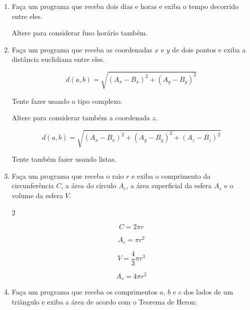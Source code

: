 \begin{enumerate}

	\item Faça um programa que receba dois dias e horas e exiba o tempo decorrido entre eles.
	
	Altere para considerar fuso horário também. 

	\item Faça um programa que receba as coordenadas $x$ e $y$ de dois pontos e exiba a distância euclidiana entre eles.
	
	\begin{equation*}
		d(a,b) = \sqrt{(A_x - B_x)^2 + (A_y - B_y)^2}
	\end{equation*}
	
	Tente fazer usando o tipo complexo.
	
	Altere para considerar também a coordenada $z$.
	
	\begin{equation*}
		d(a,b) = \sqrt{(A_x - B_x)^2 + (A_y - B_y)^2 + (A_z - B_z)^2}
	\end{equation*}
	
	Tente também fazer usando listas.
	
	\item Faça um programa que receba o raio $r$ e exiba o comprimento da circunferência $C$, a área do círculo $A_c$, a área superficial da esfera $A_s$ e o volume da esfera $V$.
	
	\begin{multicols}{2}
			
		\begin{equation*}
			C = 2 \pi r
		\end{equation*}
		
		\begin{equation*}
			A_c = \pi r^2
		\end{equation*}		
		
		\begin{equation*}
			V = \frac{4}{3} \pi r^3
		\end{equation*}
		
		\begin{equation*}
			A_s = 4 \pi r^2
		\end{equation*}
		
	\end{multicols}
	
\quebra	
	
	\item Faça um programa que receba os comprimentos $a$, $b$ e $c$ dos lados de um triângulo e exiba a área de acordo com o Teorema de Heron:
	

\end{enumerate}
